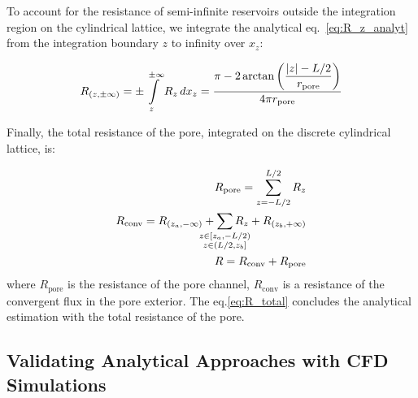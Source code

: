 \documentclass[10pt, a4paper]{article}
\begin{document}
\begin{multicols}{2}
To account for the resistance of semi-infinite reservoirs outside the integration region on the cylindrical lattice, we integrate the analytical eq.~\ref{eq:R_z_analyt} from the integration boundary $z$ to infinity over $x_z$:

\begin{eqnarray}
    \label{eq:r_reservoir}
    R_{(z, \pm\infty)} = \pm \int\displaylimits_{z}^{\pm\infty} R_z \, dx_z = \dfrac{\pi - 2 \arctan\left( \dfrac{|z| - L/2}{r_{\textrm{pore}}} \right)}{4 \pi r_{\textrm{pore}}}
\end{eqnarray}

Finally, the total resistance of the pore, integrated on the discrete cylindrical lattice, is:

\begin{eqnarray}
    R_{\textrm{pore}} = \sum_{z=-L/2}^{L/2} R_z
    \\
    R_{\textrm{conv}} = R_{(z_{a}, -\infty)} + \sum\limits_{\mathclap{\substack{z \in [z_{a},-L/2)\\z \in (L/2, z_b]}}} R_z + R_{(z_{b}, +\infty)}
    \\
    \label{eq:R_total}
    R = R_{\textrm{conv}} + R_{\textrm{pore}}
\end{eqnarray}
where $R_{\textrm{pore}}$ is the resistance of the pore channel, $R_{\textrm{conv}}$ is a resistance of the convergent flux in the pore exterior.
The eq.\ref{eq:R_total} concludes the analytical estimation with the total resistance of the pore.


\end{multicols}

\subsection*{Validating Analytical Approaches with CFD Simulations}
\end{document}
